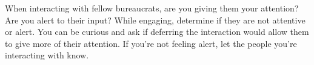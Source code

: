 When interacting with fellow bureaucrats, are you giving them your attention? Are you alert to their input? While engaging, determine if they are not attentive or alert. You can be curious and ask if deferring the interaction would allow them to give more of their attention. If you're not feeling alert, let the people you're interacting with know.


